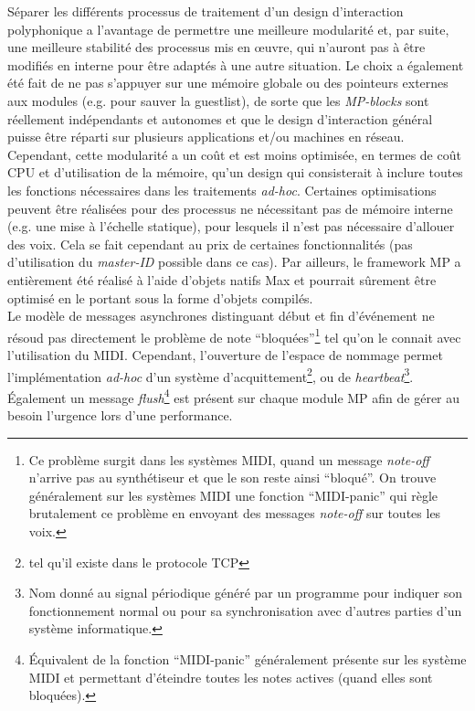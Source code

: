 \noindent Séparer les différents processus de traitement d'un design d'interaction polyphonique a l'avantage de permettre une meilleure modularité et, par suite, une meilleure stabilité des processus mis en œuvre, qui n'auront pas à être modifiés en interne pour être adaptés à une autre situation. Le choix a également été fait de ne pas s'appuyer sur une mémoire globale ou des pointeurs externes aux modules (e.g. pour sauver la guestlist), de sorte que les \textit{MP-blocks} sont réellement indépendants et autonomes et que le design d'interaction général puisse être réparti sur plusieurs applications et/ou machines en réseau.\\
\indent Cependant, cette modularité a un coût et est moins optimisée, en termes de coût \gls{CPU} et d'utilisation de la mémoire, qu'un design qui consisterait à inclure toutes les fonctions nécessaires dans les traitements \textit{ad-hoc}. Certaines optimisations peuvent être réalisées pour des processus ne nécessitant pas de mémoire interne (e.g. une mise à l'échelle statique), pour lesquels il n'est pas nécessaire d'allouer des voix. Cela se fait cependant au prix de certaines fonctionnalités (pas d'utilisation du \textit{master-ID} possible dans ce cas). Par ailleurs, le framework MP a entièrement été réalisé à l'aide d'objets natifs Max et pourrait sûrement être optimisé en le portant sous la forme d'objets compilés.\\
\indent Le modèle de messages asynchrones distinguant début et fin d'événement ne résoud pas directement le problème de note ``bloquées''\footnote{Ce problème surgit dans les systèmes MIDI, quand un message \textit{note-off} n'arrive pas au synthétiseur et que le son reste ainsi ``bloqué''. On trouve généralement sur les systèmes MIDI une fonction ``MIDI-panic'' qui règle brutalement ce problème en envoyant des messages \textit{note-off} sur toutes les voix.} tel qu'on le connait avec l'utilisation du \gls{MIDI}. Cependant, l'ouverture de l'espace de nommage permet l'implémentation \textit{ad-hoc} d'un système d'acquittement\footnote{tel qu'il existe dans le protocole \gls{TCP}}, ou de \textit{heartbeat}\footnote{Nom donné au signal périodique généré par un programme pour indiquer son fonctionnement normal ou pour sa synchronisation avec d'autres parties d'un système informatique.}. Également un message \textit{flush}\footnote{Équivalent de la fonction ``MIDI-panic'' généralement présente sur les système MIDI et permettant d'éteindre toutes les notes actives (quand elles sont bloquées).} est présent sur chaque module MP afin de gérer au besoin l'urgence lors d'une performance.


